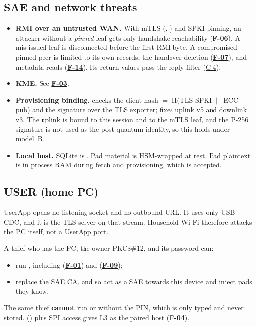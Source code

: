 \documentclass[11pt,a4paper]{article}
\newcommand{\fid}[1]{\textbf{#1}}
\begin{document}
\subsection{SAE and network threats}
\begin{itemize}
\item \textbf{RMI over an untrusted WAN.} With mTLS (, ) and SPKI pinning, an attacker without a \emph{pinned} leaf gets only handshake reachability (\hyperref[f:F-06]{\fid{F-06}}). A mis-issued  leaf is disconnected before the first RMI byte. A compromised pinned peer is limited to its own records, the handover deletion (\hyperref[f:F-07]{\fid{F-07}}), and metadata reads (\hyperref[f:F-14]{\fid{F-14}}). Its return values pass the reply filter (\hyperref[c:C-4]{C-4}).
\item \textbf{KME.} See \hyperref[f:F-03]{\fid{F-03}}.
\item \textbf{Provisioning binding.}  checks the client hash $=$ H(TLS SPKI $\|$ ECC pub) and the signature over the TLS exporter;  fixes uplink v5 and downlink v3. The uplink is bound to this session and to the mTLS leaf, and the P-256 signature is not used as the post-quantum identity, so this holds under model~B.
\item \textbf{Local host.} SQLite is . Pad material is HSM-wrapped at rest. Pad plaintext is in process RAM during fetch and provisioning, which is accepted.
\end{itemize}

\subsection{USER (home PC)}
UserApp opens no listening socket and no outbound URL. It uses only USB CDC, and it is the TLS server on that stream. Household Wi-Fi therefore attacks the PC itself, not a UserApp port.

A thief who has the PC, the owner PKCS\#12, and its password can:
\begin{itemize}
\item run , including  (\hyperref[f:F-01]{\fid{F-01}}) and  (\hyperref[f:F-09]{\fid{F-09}});
\item replace the SAE CA, and so act as a SAE towards this device and inject pads they know.
\end{itemize}
The same thief \textbf{cannot} run  or  without the PIN, which is only typed and never stored.  () plus SPI access gives L3 as the paired host (\hyperref[f:F-04]{\fid{F-04}}).
\end{document}
